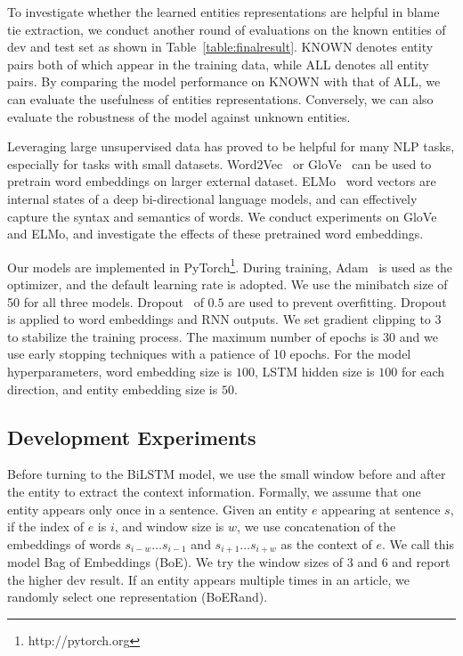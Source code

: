 \documentclass[letterpaper]{article} %
\begin{document}
To investigate whether the learned entities representations are helpful in blame tie extraction, we conduct another round of evaluations on the known entities of dev and test set as shown in Table~\ref{table:finalresult}. KNOWN denotes entity pairs both of which appear in the training data, while ALL denotes all entity pairs. By comparing the model performance on KNOWN with that of ALL, we can evaluate the usefulness of entities representations. Conversely, we can also evaluate the robustness of the model against unknown entities.

Leveraging large unsupervised data has proved to be helpful for many NLP tasks, especially for tasks with small datasets. Word2Vec~\cite{DBLP:journals/corr/abs-1301-3781} or GloVe~\cite{pennington2014glove} can be used to pretrain word embeddings on larger external dataset. ELMo~\cite{Peters:2018} word vectors are internal states of a deep bi-directional language models, and can effectively capture the syntax and semantics of words. We conduct experiments on GloVe and ELMo, and investigate the effects of these pretrained word embeddings.

Our models are implemented in PyTorch\footnote{http://pytorch.org}. During training, Adam~\cite{kingma2014adam} is used as the optimizer, and the default learning rate is adopted. We use the minibatch size of 50 for all three models. Dropout~\cite{hinton2012improving} of $0.5$ are used to prevent overfitting. Dropout is applied to word embeddings and RNN outputs. We set gradient clipping to 3 to stabilize the training process. The maximum number of epochs is 30 and we use early stopping techniques with a patience of 10 epochs. For the model hyperparameters, word embedding size is $100$, LSTM hidden size is $100$ for each direction, and entity embedding size is $50$.

\subsection{Development Experiments}

Before turning to the BiLSTM model, we use the small window before and after the entity to extract the context information. Formally, we assume that one entity appears only once in a sentence. Given an entity $e$ appearing at sentence $s$, if the index of $e$ is $i$, and window size is $w$, we use concatenation of the embeddings of words $s_{i-w}\ldots s_{i-1}$ and $s_{i+1}\ldots s_{i+w}$ as the context of $e$. We call this model Bag of Embeddings (BoE). We try the window sizes of 3 and 6 and report the higher dev result. If an entity appears multiple times in an article, we randomly select one representation (BoERand).
\end{document}
